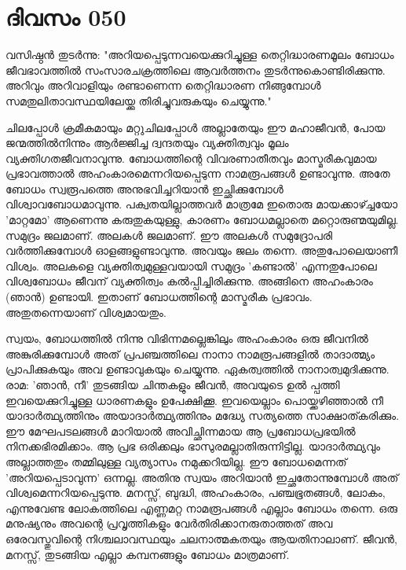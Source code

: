 \newpage
\section{ദിവസം 050}


വസിഷ്ഠന്‍ തുടര്‍ന്നു: "അറിയപ്പെടുന്നവയെക്കുറിച്ചുള്ള തെറ്റിദ്ധാരണമൂലം ബോധം ജീവഭാവത്തില്‍ സംസാരചക്രത്തിലെ ആവര്‍ത്തനം തുടര്‍ന്നുകൊണ്ടിരിക്കുന്നു. അറിവും അറിവാളിയും രണ്ടാണെന്ന തെറ്റിദ്ധാരണ നിങ്ങുമ്പോള്‍ സമതുലിതാവസ്ഥയിലേയ്ക്കു തിരിച്ചുവരുകയും ചെയ്യുന്നു."

ചിലപ്പോള്‍ ക്രമീകമായും മറ്റുചിലപ്പോള്‍ അല്ലാതേയും ഈ മഹാജീവന്‍, പോയ ജന്മത്തില്‍നിന്നും ആര്‍ജ്ജിച്ച ദ്വന്ദതയും വ്യക്തിത്വവും മൂലം വ്യക്തിഗതജീവനാവുന്നു. ബോധത്തിന്റെ വിവരണാതീതവും മാസ്മരീകവുമായ പ്രഭാവത്താല്‍ അഹംകാരമെന്നറിയപ്പെടുന്ന നാമരൂപങ്ങള്‍ ഉണ്ടാവുന്നു. അതേ ബോധം സ്വരൂപത്തെ അനുഭവിച്ചറിയാന്‍ ഇച്ഛിക്കുമ്പോള്‍ വിശ്വാവബോധമാവുന്നു. പക്വതയില്ലാത്തവര്‍ മാത്രമേ ഇതൊരു മായക്കാഴ്ച്ചയോ 'മാറ്റമോ' ആണെന്നു കരുതുകയുള്ളു, കാരണം ബോധമല്ലാതെ മറ്റൊരുണ്മയുമില്ല. സമുദ്രം ജലമാണ്‌. അലകള്‍ ജലമാണ്‌. ഈ അലകള്‍ സമുദ്രോപരി വര്‍ത്തിക്കുമ്പോള്‍ ഓളങ്ങളുണ്ടാവുന്നു. അവയും ജലം തന്നെ. അതുപോലെയാണീ വിശ്വം. അലകളെ വ്യക്തിത്വമുള്ളവയായി സമുദ്രം 'കണ്ടാല്‍' എന്നതുപോലെ വിശ്വബോധം ജീവന്‌ വ്യക്തിത്വം കല്‍പ്പിച്ചിരിക്കുന്നു. അങ്ങിനെ അഹംകാരം (ഞാന്‍) ഉണ്ടായി. ഇതാണ്‌ ബോധത്തിന്റെ മാസ്മരീക പ്രഭാവം. അതുതന്നെയാണ്‌ വിശ്വമായതും.

സ്വയം, ബോധത്തില്‍ നിന്നു വിഭിന്നമല്ലെങ്കിലും അഹംകാരം ഒരു ജീവനില്‍ അങ്കുരിക്കുമ്പോള്‍ അത്‌ പ്രപഞ്ചത്തിലെ നാനാ നാമരൂപങ്ങളില്‍ താദാത്മ്യം പ്രാപിക്കുകയും അവ ഉണ്ടാവുകയും ചെയ്യുന്നു. ഏകത്വത്തില്‍ നാനാത്വമുദിക്കുന്നു. രാമ: 'ഞാന്‍, നീ' തുടങ്ങിയ ചിന്തകളും ജീവന്‍, അവയുടെ ഉല്‍ പ്പത്തി ഇവയെക്കുറിച്ചുള്ള ധാരണകളും ഉപേക്ഷിക്കൂ. ഇവയെല്ലാം പൊയ്ക്കഴിഞ്ഞാല്‍ നീ യാദാര്‍ത്ഥ്യത്തിനും അയാദാര്‍ത്ഥ്യത്തിനും മദ്ധ്യേ സത്യത്തെ സാക്ഷാത്കരിക്കും. ഈ മേഘപടലങ്ങള്‍ മാറിയാല്‍ അവിച്ഛിന്നമായ ആ പ്രബോധപ്രഭയില്‍ നിനക്കഭിരമിക്കാം. ആ പ്രഭ ഒരിക്കലും ഭാസുരമല്ലാതിരുന്നിട്ടില്ല. യാദാര്‍ത്ഥ്യവും അല്ലാത്തതും തമ്മിലുള്ള വ്യത്യാസം നമുക്കറിയില്ല. ഈ ബോധമെന്നത്‌ 'അറിയപ്പെടാവുന്ന' ഒന്നല്ല. അതിനു സ്വയം അറിയാന്‍ ഇച്ഛതോന്നുമ്പോള്‍ അത്‌ വിശ്വമെന്നറിയപ്പെടുന്നു. മനസ്സ്‌, ബുദ്ധി, അഹംകാരം, പഞ്ചഭൂതങ്ങള്‍, ലോകം, എന്നുവേണ്ട ലോകത്തിലെ എണ്ണമറ്റ നാമരൂപങ്ങള്‍ എല്ലാം ബോധം തന്നെ. ഒരു മനുഷ്യനും അവന്റെ പ്രവൃത്തികളും വേര്‍തിരിക്കാനരുതാത്തത്‌ അവ ഒരേവസ്തുവിന്റെ നിശ്ചലാവസ്ഥയും ചലനാത്മകതയും ആയതിനാലാണ്‌. ജീവന്‍, മനസ്സ്‌, തുടങ്ങിയ എല്ലാ കമ്പനങ്ങളും ബോധം മാത്രമാണ്‌.
